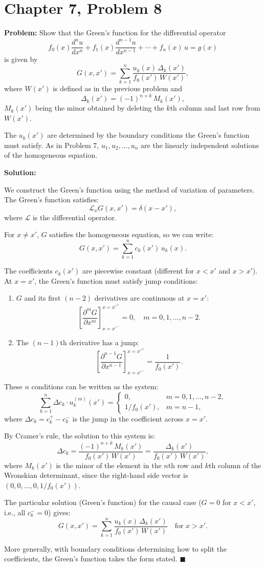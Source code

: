 \documentclass[12pt]{article}
\begin{document}
\section*{Chapter 7, Problem 8}

\textbf{Problem:} Show that the Green's function for the differential operator
\[
f_0(x)\frac{d^n u}{dx^n} + f_1(x)\frac{d^{n-1}u}{dx^{n-1}} + \cdots + f_n(x)\,u = g(x)
\]
is given by
\[
G(x,x') = \sum_{k=1}^{n} \frac{u_k(x)\,\Delta_k(x')}{f_0(x')\,W(x')},
\]
where $W(x')$ is defined as in the previous problem and
\[
\Delta_k(x') = (-1)^{n+k}\,M_k(x'),
\]
$M_k(x')$ being the minor obtained by deleting the $k$th column and last row from $W(x')$.

The $u_k(x')$ are determined by the boundary conditions the Green's function must satisfy. As in Problem 7, $u_1, u_2, \ldots, u_n$ are the linearly independent solutions of the homogeneous equation.

\bigskip
\textbf{Solution:}

We construct the Green's function using the method of variation of parameters. The Green's function satisfies:
\[
\mathcal{L}_x G(x,x') = \delta(x - x'),
\]
where $\mathcal{L}$ is the differential operator.

For $x \neq x'$, $G$ satisfies the homogeneous equation, so we can write:
\[
G(x,x') = \sum_{k=1}^n c_k(x')\,u_k(x).
\]

The coefficients $c_k(x')$ are piecewise constant (different for $x < x'$ and $x > x'$). At $x = x'$, the Green's function must satisfy jump conditions:

\begin{enumerate}
\item $G$ and its first $(n-2)$ derivatives are continuous at $x = x'$:
\[
\left[\frac{\partial^m G}{\partial x^m}\right]_{x=x'^-}^{x=x'^+} = 0, \quad m = 0, 1, \ldots, n-2.
\]
\item The $(n-1)$th derivative has a jump:
\[
\left[\frac{\partial^{n-1} G}{\partial x^{n-1}}\right]_{x=x'^-}^{x=x'^+} = \frac{1}{f_0(x')}.
\]
\end{enumerate}

These $n$ conditions can be written as the system:
\[
\sum_{k=1}^n \Delta c_k \cdot u_k^{(m)}(x') = \begin{cases} 0, & m = 0,1,\ldots,n-2, \\ 1/f_0(x'), & m = n-1, \end{cases}
\]
where $\Delta c_k = c_k^+ - c_k^-$ is the jump in the coefficient across $x = x'$.

By Cramer's rule, the solution to this system is:
\[
\Delta c_k = \frac{(-1)^{n+k}\,M_k(x')}{f_0(x')\,W(x')} = \frac{\Delta_k(x')}{f_0(x')\,W(x')},
\]
where $M_k(x')$ is the minor of the element in the $n$th row and $k$th column of the Wronskian determinant, since the right-hand side vector is $(0,0,\ldots,0,1/f_0(x'))$.

The particular solution (Green's function) for the causal case ($G = 0$ for $x < x'$, i.e., all $c_k^- = 0$) gives:
\[
G(x,x') = \sum_{k=1}^n \frac{u_k(x)\,\Delta_k(x')}{f_0(x')\,W(x')} \quad \text{for } x > x'.
\]

More generally, with boundary conditions determining how to split the coefficients, the Green's function takes the form stated. $\blacksquare$
\end{document}
